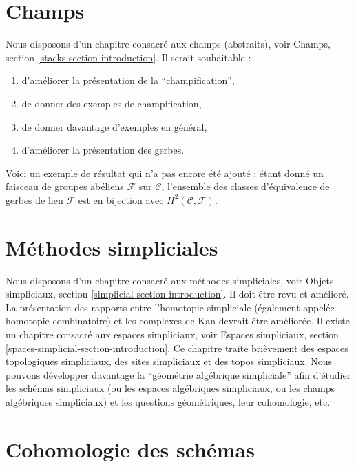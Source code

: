 \section{Champs}
\label{section-stacks}

\noindent
Nous disposons d'un chapitre consacré aux champs (abstraits), voir
Champs, section \ref{stacks-section-introduction}.
Il serait souhaitable :
\begin{enumerate}
\item d'améliorer la présentation de la ``champification'',
\item de donner des exemples de champification,
\item de donner davantage d'exemples en général,
\item d'améliorer la présentation des gerbes.
\end{enumerate}
Voici un exemple de résultat qui n'a pas encore été ajouté : étant donné un faisceau de groupes
abéliens $\mathcal{F}$
sur $\mathcal{C}$, l'ensemble des classes d'équivalence de gerbes de lien
$\mathcal{F}$ est en bijection avec $H^2(\mathcal{C}, \mathcal{F})$.


\section{Méthodes simpliciales}
\label{section-simplicial}

\noindent
Nous disposons d'un chapitre consacré aux méthodes simpliciales, voir
Objets simpliciaux, section \ref{simplicial-section-introduction}.
Il doit être revu et amélioré. La présentation des
rapports entre l'homotopie simpliciale (également appelée
homotopie combinatoire) et les complexes de Kan devrait être améliorée.
Il existe un chapitre consacré aux espaces simpliciaux, voir
Espaces simpliciaux, section \ref{spaces-simplicial-section-introduction}.
Ce chapitre traite brièvement des
espaces topologiques simpliciaux, des sites simpliciaux et des topos simpliciaux.
Nous pouvons développer davantage la ``géométrie algébrique simpliciale'' afin d'étudier
les schémas simpliciaux (ou les espaces algébriques simpliciaux, ou
les champs algébriques simpliciaux) et les questions géométriques, leur cohomologie,
etc.


\section{Cohomologie des schémas}
\label{section-schemes-cohomology}

